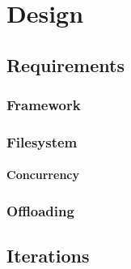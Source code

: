 
\chapter{Design} %



\ifpdf
    \graphicspath{{7/figures/PNG/}{7/figures/PDF/}{7/figures/}}
\else
    \graphicspath{{7/figures/EPS/}{7/figures/}}
\fi


% 

\section{Requirements}

\subsection{Framework}


\subsection{Filesystem}



\subsubsection{Concurrency}

\subsection{Offloading}


\section{Iterations}

